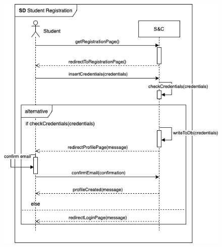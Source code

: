 \begin{enumerate}[label=\textbf{[US\arabic*]}, left = 0pt, align = left, resume]
\begin{figure}[h!]
                    \includegraphics[width=1\textwidth]{RASD/Images/UseCases/StudentRegistration.drawio.png}
                \label{fig:example}
                \end{figure}

            
                
                
                

\end{enumerate}
